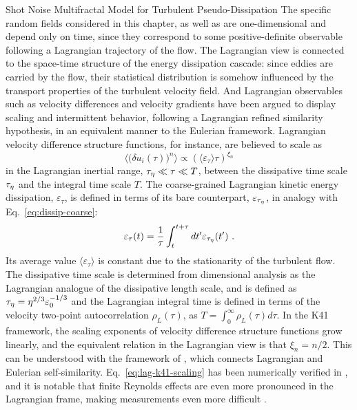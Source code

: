\begin{chapter}{Shot Noise Multifractal Model for Turbulent Pseudo-Dissipation}
The specific random fields considered in this chapter, as well as \textcite{schmitt2003,perpete2011,pereira2018multifractal} are one-dimensional and depend only on time, since they correspond to some positive-definite observable following a Lagrangian trajectory of the flow.
The Lagrangian view is connected to the space-time structure of the energy dissipation cascade: since eddies are carried by the flow, their statistical distribution is somehow influenced by the transport properties of the turbulent velocity field.
And Lagrangian observables such as velocity differences and velocity gradients have been argued to display scaling and intermittent behavior, following a Lagrangian refined similarity hypothesis, in an equivalent manner to the Eulerian framework. Lagrangian velocity difference structure functions, for instance, are believed to scale as
\begin{equation} \label{eq:lag-k41-scaling}
    \langle \big( \delta u_i(\tau) \big)^n \rangle \propto (\langle \varepsilon_{\tau} \rangle \tau)^{\xi_n}
\end{equation}
in the Lagrangian inertial range, $\tau_{\eta} \ll \tau \ll T$, between the dissipative time scale $\tau_{\eta}$ and the integral time scale $T$.
The coarse-grained Lagrangian kinetic energy dissipation, $\varepsilon_{\tau}$, is defined in terms of its bare counterpart, $\varepsilon_{\tau_{\eta}}$, in analogy with Eq.~\eqref{eq:dissip-coarse}:
\begin{equation} \label{eq:dissip-coarse-1dim}
    \varepsilon_{\tau}(t) = \frac{1}{\tau} \int_{t}^{t+\tau} dt'
    \varepsilon_{\tau_{\eta}}(t') \ .
\end{equation}
Its average value $\langle \varepsilon_{\tau} \rangle$ is constant due to the stationarity of the turbulent flow. The dissipative time scale is determined from dimensional analysis as the Lagrangian analogue of the dissipative length scale, and is defined as $\tau_{\eta} = \eta^{2/3} \varepsilon_0^{-1/3}$ and the Lagrangian integral time is defined in terms of the velocity two-point autocorrelation $\rho_L(\tau)$, as $T = \int_0^{\infty} \rho_L(\tau) d\tau$.
In the K41 framework, the scaling exponents of velocity difference structure functions grow linearly, and the equivalent relation in the Lagrangian view is that $\xi_n = n/2$. This can be understood with the framework of \textcite{borgas1993}, which connects Lagrangian and Eulerian self-similarity.
Eq.~\eqref{eq:lag-k41-scaling} has been numerically verified in \textcite{benzi2009,sawfordyeung2011,barjona2017}, and it is notable that finite Reynolds effects are even more pronounced in the Lagrangian frame, making measurements even more difficult \parencite{yeung2002}.


\end{chapter}
